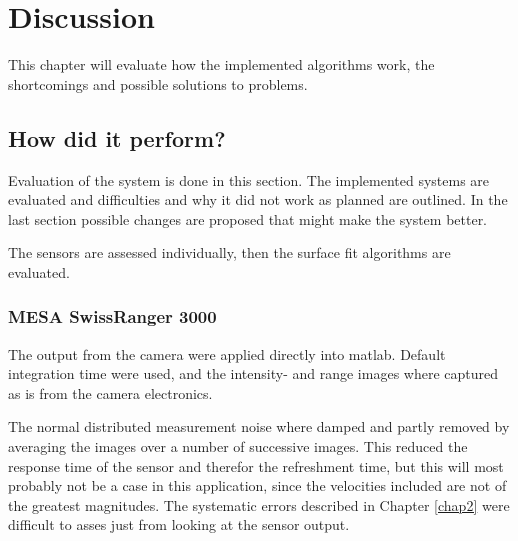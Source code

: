 
\chapter{Discussion}
\label{chap8}
This chapter will evaluate how the implemented algorithms work, the shortcomings and
possible solutions to problems. 

\section{How did it perform?}
Evaluation of the system is done in this section. The implemented systems are evaluated
and difficulties and why it did not work as planned are outlined. In the last section
possible changes are proposed that might make the system better. 

The sensors are assessed individually, then the surface fit algorithms are evaluated.


\subsection{MESA SwissRanger 3000}
The output from the camera were applied directly into matlab. Default
integration time were used, and the intensity- and range images where captured as is from
the camera electronics.

The normal distributed measurement noise where damped and partly removed by averaging the images over a number
of successive images. This reduced the response time of the sensor and therefor the
refreshment time, but this will most probably not be a case in this application, since the
velocities included are not of the greatest magnitudes. 
The systematic errors described in Chapter \ref{chap2} were difficult to asses just from
looking at the sensor output.

